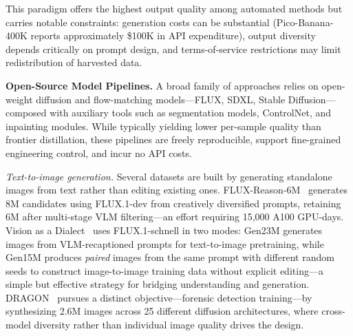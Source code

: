 \documentclass{llmxive}
\begin{document}
This paradigm offers the highest output quality among automated methods but carries notable constraints: generation costs can be substantial (Pico-Banana-400K reports approximately \$100K in API expenditure), output diversity depends critically on prompt design, and terms-of-service restrictions may limit redistribution of harvested data.

\textbf{Open-Source Model Pipelines.}
A broad family of approaches relies on open-weight diffusion and flow-matching models---FLUX, SDXL, Stable Diffusion---composed with auxiliary tools such as segmentation models, ControlNet, and inpainting modules. While typically yielding lower per-sample quality than frontier distillation, these pipelines are freely reproducible, support fine-grained engineering control, and incur no API costs.

\emph{Text-to-image generation.}
Several datasets are built by generating standalone images from text rather than editing existing ones. FLUX-Reason-6M~\citep{fang2025flux} generates 8M candidates using FLUX.1-dev from creatively diversified prompts, retaining 6M after multi-stage VLM filtering---an effort requiring 15,000 A100 GPU-days. Vision as a Dialect~\citep{han2025vision} uses FLUX.1-schnell in two modes: Gen23M generates images from VLM-recaptioned prompts for text-to-image pretraining, while Gen15M produces \emph{paired} images from the same prompt with different random seeds to construct image-to-image training data without explicit editing---a simple but effective strategy for bridging understanding and generation. DRAGON~\citep{bertazzini2025dragon} pursues a distinct objective---forensic detection training---by synthesizing 2.6M images across 25 different diffusion architectures, where cross-model diversity rather than individual image quality drives the design.
\end{document}
